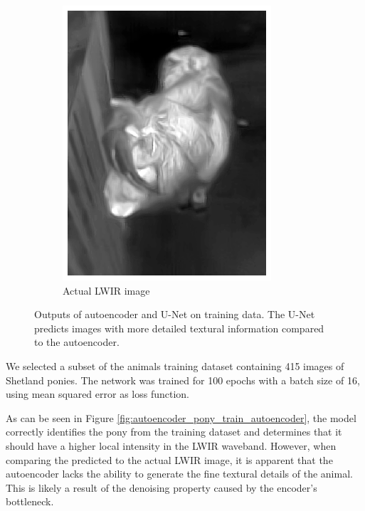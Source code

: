 \documentclass{l4proj}
\begin{document}
\begin{figure}[ht]
\begin{subfigure}[h!]{0.22\textwidth}
    \includegraphics[width=\textwidth]{images/autoencoder/train/lwir.png}
    \caption{Actual LWIR image}
  \end{subfigure}
  \caption{Outputs of autoencoder and U-Net on training data. The U-Net predicts images with more detailed textural information compared to the autoencoder.}
  \label{fig:autoencoder_pony_train}
\end{figure}

We selected a subset of the animals training dataset containing 415 images of Shetland ponies. The network was trained for 100 epochs with a batch size of 16, using mean squared error as loss function.

As can be seen in Figure \ref{fig:autoencoder_pony_train_autoencoder}, the model correctly identifies the pony from the training dataset and determines that it should have a higher local intensity in the LWIR waveband. However, when comparing the predicted to the actual LWIR image, it is apparent that the autoencoder lacks the ability to generate the fine textural details of the animal. This is likely a result of the denoising property caused by the encoder's bottleneck.
\end{document}
